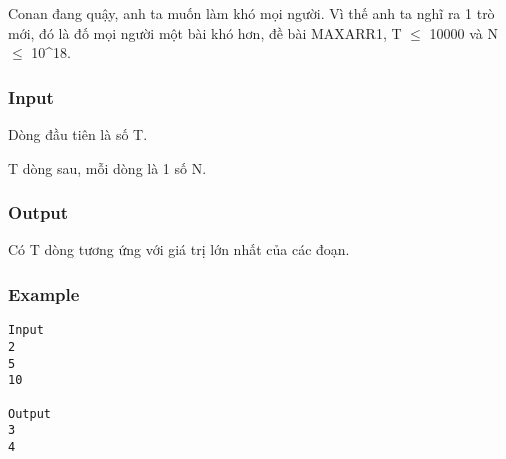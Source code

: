 



   Conan đang quậy, anh ta muốn làm khó mọi người. Vì thế anh ta nghĩ ra 1 trò mới, đó là đố mọi người một bài khó hơn, đề bài MAXARR1, T  $\le$  10000 và N  $\le$  10^18.  

\subsubsection{   Input  }

   Dòng đầu tiên là số T.  

   T dòng sau, mỗi dòng là 1 số N.  

\subsubsection{   Output  }

   Có T dòng tương ứng với giá trị lớn nhất của các đoạn.  

\subsubsection{   Example  }
\begin{verbatim}
Input
2
5
10

Output
3
4
\end{verbatim}
